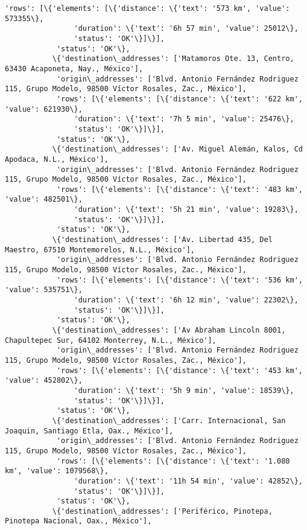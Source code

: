 \documentclass[11pt]{article}
\begin{document}
\begin{Verbatim}[commandchars=\\\{\}]
            'rows': [\{'elements': [\{'distance': \{'text': '573 km', 'value': 573355\},
                'duration': \{'text': '6h 57 min', 'value': 25012\},
                'status': 'OK'\}]\}],
            'status': 'OK'\},
           \{'destination\_addresses': ['Matamoros Ote. 13, Centro, 63430 Acaponeta, Nay., México'],
            'origin\_addresses': ['Blvd. Antonio Fernández Rodriguez 115, Grupo Modelo, 98500 Víctor Rosales, Zac., México'],
            'rows': [\{'elements': [\{'distance': \{'text': '622 km', 'value': 621930\},
                'duration': \{'text': '7h 5 min', 'value': 25476\},
                'status': 'OK'\}]\}],
            'status': 'OK'\},
           \{'destination\_addresses': ['Av. Miguel Alemán, Kalos, Cd Apodaca, N.L., México'],
            'origin\_addresses': ['Blvd. Antonio Fernández Rodriguez 115, Grupo Modelo, 98500 Víctor Rosales, Zac., México'],
            'rows': [\{'elements': [\{'distance': \{'text': '483 km', 'value': 482501\},
                'duration': \{'text': '5h 21 min', 'value': 19283\},
                'status': 'OK'\}]\}],
            'status': 'OK'\},
           \{'destination\_addresses': ['Av. Libertad 435, Del Maestro, 67510 Montemorelos, N.L., México'],
            'origin\_addresses': ['Blvd. Antonio Fernández Rodriguez 115, Grupo Modelo, 98500 Víctor Rosales, Zac., México'],
            'rows': [\{'elements': [\{'distance': \{'text': '536 km', 'value': 535751\},
                'duration': \{'text': '6h 12 min', 'value': 22302\},
                'status': 'OK'\}]\}],
            'status': 'OK'\},
           \{'destination\_addresses': ['Av Abraham Lincoln 8001, Chapultepec Sur, 64102 Monterrey, N.L., México'],
            'origin\_addresses': ['Blvd. Antonio Fernández Rodriguez 115, Grupo Modelo, 98500 Víctor Rosales, Zac., México'],
            'rows': [\{'elements': [\{'distance': \{'text': '453 km', 'value': 452802\},
                'duration': \{'text': '5h 9 min', 'value': 18539\},
                'status': 'OK'\}]\}],
            'status': 'OK'\},
           \{'destination\_addresses': ['Carr. Internacional, San Joaquin, Santiago Etla, Oax., México'],
            'origin\_addresses': ['Blvd. Antonio Fernández Rodriguez 115, Grupo Modelo, 98500 Víctor Rosales, Zac., México'],
            'rows': [\{'elements': [\{'distance': \{'text': '1.080 km', 'value': 1079568\},
                'duration': \{'text': '11h 54 min', 'value': 42852\},
                'status': 'OK'\}]\}],
            'status': 'OK'\},
           \{'destination\_addresses': ['Periférico, Pinotepa, Pinotepa Nacional, Oax., México'],

\end{Verbatim}
\end{document}
